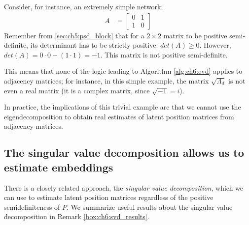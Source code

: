 Consider, for instance, an extremely simple network:
\begin{align*}
    A &= \begin{bmatrix}
        0 & 1 \\
        1 & 0
    \end{bmatrix}
\end{align*}
Remember from \ref{sec:ch5:psd_block} that for a $2 \times 2$ matrix to be positive semi-definite, its determinant has to be strictly positive: $det(A) \geq 0$. However, $det(A) = 0 \cdot 0 - (1 \cdot 1) = -1$. This matrix is not positive semi-definite. 

This means that none of the logic leading to Algorithm \ref{alg:ch6:evd} applies to adjacency matrices; for instance, in this simple example, the matrix $\sqrt{\Lambda_d}$ is not even a real matrix (it is a complex matrix, since $\sqrt{-1} = i$). 

In practice, the implications of this trivial example are that we cannot use the eigendecomposition to obtain real estimates of latent position matrices from adjacency matrices.

\subsection{The singular value decomposition allows us to estimate embeddings}

There is a closely related approach, the \textit{singular value decomposition}, which we can use to estimate latent position matrices regardless of the positive semidefiniteness of $P$. We summarize useful results about the singular value decomposition in Remark \ref{box:ch6:svd_results}.


